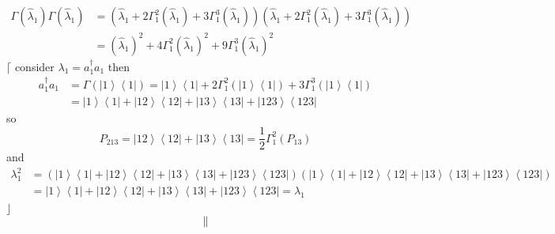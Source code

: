 \documentclass[aps,preprint]{revtex4}%
\begin{document}
\begin{align}
\Gamma\left(  \hat{\lambda}_{1}\right)  \Gamma\left(  \hat{\lambda}%
_{1}\right)    & =\left(  \hat{\lambda}_{1}+2\Gamma_{1}^{2}\left(
\hat{\lambda}_{1}\right)  +3\Gamma_{1}^{3}\left(  \hat{\lambda}_{1}\right)
\right)  \left(  \hat{\lambda}_{1}+2\Gamma_{1}^{2}\left(  \hat{\lambda}%
_{1}\right)  +3\Gamma_{1}^{3}\left(  \hat{\lambda}_{1}\right)  \right)
\nonumber\\
& =\left(  \hat{\lambda}_{1}\right)  ^{2}+4\Gamma_{1}^{2}\left(  \hat{\lambda
}_{1}\right)  ^{2}+9\Gamma_{1}^{3}\left(  \hat{\lambda}_{1}\right)  ^{2}%
\end{align}
$\lceil$ consider $\lambda_{1}=a_{1}^{\dagger}a_{1}$ then
\begin{align}
a_{1}^{\dagger}a_{1}  & =\Gamma\left(  \left\vert 1\right\rangle \left\langle
1\right\vert \right)  =\left\vert 1\right\rangle \left\langle 1\right\vert
+2\Gamma_{1}^{2}\left(  \left\vert 1\right\rangle \left\langle 1\right\vert
\right)  +3\Gamma_{1}^{3}\left(  \left\vert 1\right\rangle \left\langle
1\right\vert \right)  \nonumber\\
& =\left\vert 1\right\rangle \left\langle 1\right\vert +\left\vert
12\right\rangle \left\langle 12\right\vert +\left\vert 13\right\rangle
\left\langle 13\right\vert +\left\vert 123\right\rangle \left\langle
123\right\vert
\end{align}
so
\begin{equation}
P_{213}=\left\vert 12\right\rangle \left\langle 12\right\vert +\left\vert
13\right\rangle \left\langle 13\right\vert =\frac{1}{2}\Gamma_{1}^{2}\left(
P_{13}\right)
\end{equation}
and
\begin{align}
\lambda_{1}^{2}  & =\left(  \left\vert 1\right\rangle \left\langle
1\right\vert +\left\vert 12\right\rangle \left\langle 12\right\vert
+\left\vert 13\right\rangle \left\langle 13\right\vert +\left\vert
123\right\rangle \left\langle 123\right\vert \right)  \left(  \left\vert
1\right\rangle \left\langle 1\right\vert +\left\vert 12\right\rangle
\left\langle 12\right\vert +\left\vert 13\right\rangle \left\langle
13\right\vert +\left\vert 123\right\rangle \left\langle 123\right\vert
\right)  \nonumber\\
& =\left\vert 1\right\rangle \left\langle 1\right\vert +\left\vert
12\right\rangle \left\langle 12\right\vert +\left\vert 13\right\rangle
\left\langle 13\right\vert +\left\vert 123\right\rangle \left\langle
123\right\vert =\lambda_{1}%
\end{align}
$\rfloor$%
\[
\parallel
\]
%
\end{document}
